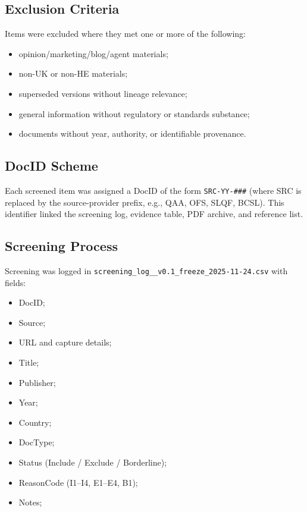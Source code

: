 \subsection{Exclusion Criteria}

Items were excluded where they met one or more of the following:

\begin{itemize}
    \item opinion/marketing/blog/agent materials;
    \item non-UK or non-HE materials;
    \item superseded versions without lineage relevance;
    \item general information without regulatory or standards substance;
    \item documents without year, authority, or identifiable provenance.
\end{itemize}

\subsection{DocID Scheme}

Each screened item was assigned a DocID of the form 
\texttt{SRC-YY-\#\#\#} (where SRC is replaced by the source-provider prefix, 
e.g., QAA, OFS, SLQF, BCSL). This identifier linked the screening log, evidence 
table, PDF archive, and reference list.


\subsection{Screening Process}

Screening was logged in \texttt{screening\_log\_\_v0.1\_freeze\_2025-11-24.csv} with fields:

\begin{itemize}
    \item DocID;
    \item Source;
    \item URL and capture details;
    \item Title;
    \item Publisher;
    \item Year;
    \item Country;
    \item DocType;
    \item Status (Include / Exclude / Borderline);
    \item ReasonCode (I1--I4, E1--E4, B1);
    \item Notes;
\end{itemize}

